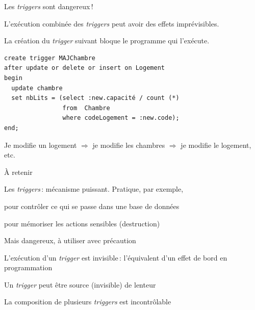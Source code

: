 \begin{frame}[fragile]{Les \textit{triggers} sont dangereux\,!}

L'exécution combinée des \textit{triggers} peut avoir  des effets imprévisibles.

\vfill

La création du \textit{trigger} suivant  \alert{bloque} le programme qui 
l'exécute. 
\vfill

\begin{small}
\begin{verbatim}
create trigger MAJChambre
after update or delete or insert on Logement
begin
  update chambre
  set nbLits = (select :new.capacité / count (*)
                from  Chambre
                where codeLogement = :new.code);
end;
\end{verbatim}
\end{small}

\vfill
\begin{blocgauche}
Je modifie un logement $\Rightarrow$ je modifie les chambres  $\Rightarrow$
je modifie le logement, etc. 
\end{blocgauche}
\end{frame}



\begin{frame}{À retenir}

Les \textit{triggers}\,: mécanisme puissant. Pratique, par exemple,
\vfill


\begin{redbullet}
   \item  pour contrôler ce qui se passe dans une base de données 
  \item pour mémoriser les actions sensibles (destruction)
\end{redbullet}
\vfill

Mais dangereux, à utiliser avec précaution

\begin{redbullet}
   \item L'exécution d'un \textit{trigger} est invisible\,: l'équivalent d'un
      effet de bord en programmation
   \item Un \textit{trigger}  peut être source (invisible) de lenteur
      \item La composition de plusieurs \textit{triggers} est incontrôlable
\end{redbullet}


\end{frame}


